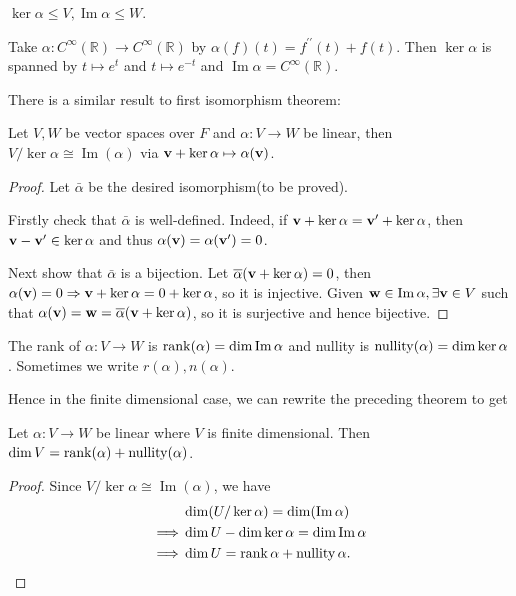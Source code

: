 \documentclass[a4paper]{article}
\begin{document}
\begin{lemma}
    $\ker\alpha\le V,\operatorname{Im}\alpha\le W$.
\end{lemma}
\begin{example}
    Take $\alpha:C^\infty(\mathbb R)\to C^\infty(\mathbb R)$ by $\alpha(f)(t)=f^{\prime\prime}(t)+f(t)$.
    Then $\ker\alpha$ is spanned by $t\mapsto e^t$ and $t\mapsto e^{-t}$ and $\operatorname{Im}\alpha=C^{\infty}(\mathbb R)$.
\end{example}
There is a similar result to first isomorphism theorem:
\begin{theorem}
    Let $V,W$ be vector spaces over $F$ and $\alpha:V\to W$ be linear, then $V/{\ker\alpha}\cong \operatorname{Im}(\alpha)$ via ${\bf v}+\ker\alpha\mapsto \alpha({\bf v})$.
\end{theorem}
\begin{proof}
    Let $ \bar{\alpha} $ be the desired isomorphism(to be proved).

    Firstly check that $ \bar{\alpha} $ is well-defined. Indeed, if $ {\bf v}+\ker \alpha={\bf v}'+\ker \alpha $, then $ {\bf v}-{\bf v}'\in \ker \alpha $ and thus $ \alpha({\bf v})=\alpha({\bf v}')=0 $.

    Next show that $ \bar{\alpha} $ is a bijection. Let $ \overline{\alpha}({\bf v}+\ker \alpha)=0 $, then $ \alpha({\bf v})=0 \Rightarrow {\bf v}+\ker \alpha=0+\ker \alpha $, so it is injective. Given $ {\bf w}\in \Im \alpha, \exists {\bf v}\in V $ such that $ \alpha({\bf v})={\bf w} =\overline{\alpha}({\bf v}+\ker \alpha)$, so it is surjective and hence bijective.
\end{proof}
\begin{definition}
    The rank of $\alpha:V\to W$ is $\rank(\alpha)=\dim\operatorname{Im}\alpha$ and nullity is $\operatorname{nullity}(\alpha)=\dim\ker\alpha$. Sometimes we write $ r(\alpha),n(\alpha) $. 
\end{definition}
Hence in the finite dimensional case, we can rewrite the preceding theorem to get
\begin{theorem}
    Let $\alpha:V\to W$ be linear where $V$ is finite dimensional.
    Then $\dim V=\rank(\alpha)+\operatorname{nullity}(\alpha)$.
\end{theorem}
\begin{proof}
    Since $ V/{\ker\alpha}\cong \operatorname{Im}(\alpha) $, we have 
    \begin{align*}
        & \dim (U/\ker \alpha)=\dim (\Im \alpha)\\ 
        \implies & \dim U-\dim \ker \alpha=\dim \Im \alpha\\ 
        \implies & \dim U = \rank \alpha+ \operatorname{nullity} \alpha.\qedhere
    \end{align*}
\end{proof}
\end{document}
